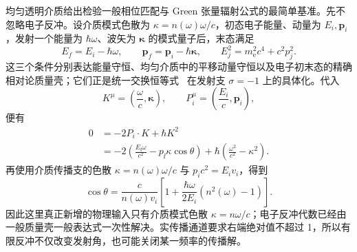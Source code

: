 均匀透明介质给出检验一般相位匹配与 Green 张量辐射公式的最简单基准。先不忽略电子反冲。设介质模式色散为 $\kappa=n(\omega)\omega/c$，初态电子能量、动量为 $E_i,\mathbf p_i$，发射一个能量为 $\hbar\omega$、波矢为 $\boldsymbol\kappa$ 的模式量子后，末态满足
\begin{equation}
\boxed{
E_f=E_i-\hbar\omega,
\qquad
\mathbf p_f=\mathbf p_i-\hbar\boldsymbol\kappa,
\qquad
E_j^2=m_{\mathrm e}^2c^4+c^2p_j^2.}
\label{eq:cherenkov_exact_mass_shell}
\end{equation}
这三个条件分别表达能量守恒、均匀介质中的平移动量守恒以及电子初末态的精确相对论质量壳；它们正是统一交换恒等式~ 在发射支 $\sigma=-1$ 上的具体化。代入
\begin{equation*}
K^\mu=\left(\frac{\omega}{c},\boldsymbol\kappa\right),
\qquad
P_i^\mu=\left(\frac{E_i}{c},\mathbf p_i\right),
\end{equation*}
便有
\begin{align*}
0
&=-2P_i\!\cdot K+\hbar K^2\\
&=-2\left(\frac{E_\ii\omega}{c^2}-p_\ii\kappa\cos\theta\right)
+\hbar\left(\frac{\omega^2}{c^2}-\kappa^2\right).
\end{align*}
再使用介质传播支的色散 $\kappa=n(\omega)\omega/c$ 与 $p_ic^2=E_iv_i$，得到
\begin{equation}
\boxed{
\cos\theta
=\frac{c}{n(\omega)v_i}
\left[1+\frac{\hbar\omega}{2E_i}(n^2(\omega)-1)\right].}
\label{eq:cherenkov_exact_recoil_angle}
\end{equation}
因此这里真正新增的物理输入只有介质模式色散 $\kappa=n\omega/c$；电子反冲代数已经由一般质量壳一般表达式一次性解决。实传播通道要求右端绝对值不超过 1，所以有限反冲不仅改变发射角，也可能关闭某一频率的传播解。

